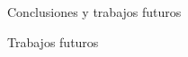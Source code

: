 \begin{chapter}{Conclusiones y trabajos futuros}
\begin{section}{Trabajos futuros}
    \end{section}
\end{chapter}